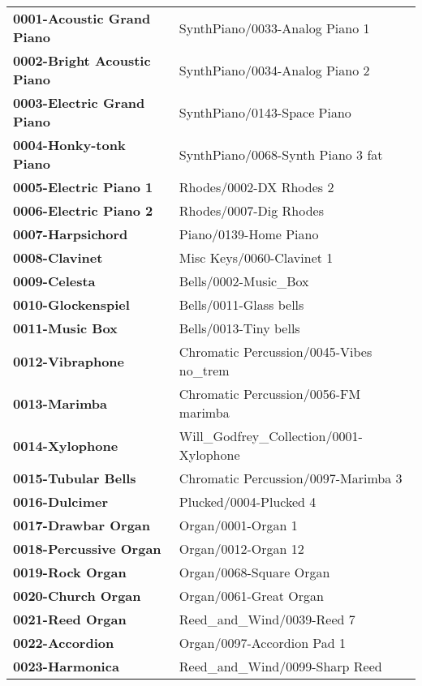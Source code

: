 \begin{longtable}{|l l|}
      \textbf{0001-Acoustic Grand Piano} &
         SynthPiano/0033-Analog Piano 1 \\
      \textbf{0002-Bright Acoustic Piano} &
         SynthPiano/0034-Analog Piano 2 \\
      \textbf{0003-Electric Grand Piano} &
         SynthPiano/0143-Space Piano \\
      \textbf{0004-Honky-tonk Piano} &
         SynthPiano/0068-Synth Piano 3 fat \\
      \textbf{0005-Electric Piano 1} &
         Rhodes/0002-DX Rhodes 2 \\
      \textbf{0006-Electric Piano 2} &
         Rhodes/0007-Dig Rhodes \\
      \textbf{0007-Harpsichord} &
         Piano/0139-Home Piano \\
      \textbf{0008-Clavinet} &
         Misc Keys/0060-Clavinet 1 \\
      \textbf{0009-Celesta} &
         Bells/0002-Music\_Box \\
      \textbf{0010-Glockenspiel} &
         Bells/0011-Glass bells \\
      \textbf{0011-Music Box} &
         Bells/0013-Tiny bells \\
      \textbf{0012-Vibraphone} &
         Chromatic Percussion/0045-Vibes no\_trem \\
      \textbf{0013-Marimba} &
         Chromatic Percussion/0056-FM marimba \\
      \textbf{0014-Xylophone} &
         Will\_Godfrey\_Collection/0001-Xylophone \\
      \textbf{0015-Tubular Bells} &
         Chromatic Percussion/0097-Marimba 3 \\
      \textbf{0016-Dulcimer} &
         Plucked/0004-Plucked 4 \\
      \textbf{0017-Drawbar Organ} &
         Organ/0001-Organ 1 \\
      \textbf{0018-Percussive Organ} &
         Organ/0012-Organ 12 \\
      \textbf{0019-Rock Organ} &
         Organ/0068-Square Organ \\
      \textbf{0020-Church Organ} &
         Organ/0061-Great Organ \\
      \textbf{0021-Reed Organ} &
         Reed\_and\_Wind/0039-Reed 7 \\
      \textbf{0022-Accordion} &
         Organ/0097-Accordion Pad 1 \\
      \textbf{0023-Harmonica} &
         Reed\_and\_Wind/0099-Sharp Reed \\

\end{longtable}

